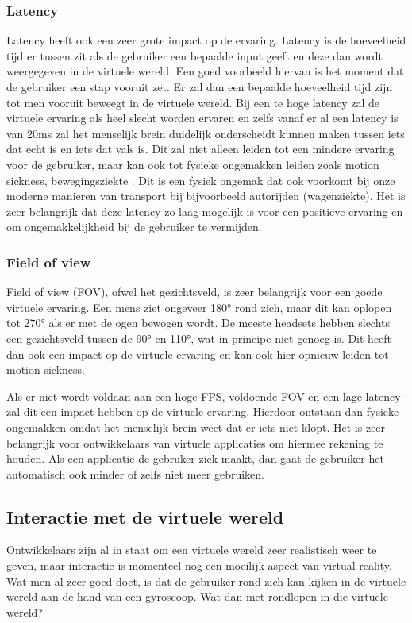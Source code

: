 \subsubsection{Latency}
\label{ssubsec:latency}
Latency heeft ook een zeer grote impact op de ervaring. Latency is de hoeveelheid tijd er tussen zit als de gebruiker een bepaalde input geeft en deze dan wordt weergegeven in de virtuele wereld. Een goed voorbeeld hiervan is het moment dat de gebruiker een stap vooruit zet. Er zal dan een bepaalde hoeveelheid tijd zijn tot men vooruit beweegt in de virtuele wereld. Bij een te hoge latency zal de virtuele ervaring als heel slecht worden ervaren en zelfs vanaf er al een latency is van 20ms zal het menselijk brein duidelijk onderscheidt kunnen maken tussen iets dat echt is en iets dat vals is. Dit zal niet alleen leiden tot een mindere ervaring voor de gebruiker, maar kan ook tot fysieke ongemakken leiden zoals motion sickness, bewegingsziekte \autocite{Pappas2016}. Dit is een fysiek ongemak dat ook voorkomt bij onze moderne manieren van transport bij bijvoorbeeld autorijden (wagenziekte). Het is zeer belangrijk dat deze latency zo laag mogelijk is voor een positieve ervaring en om ongemakkelijkheid bij de gebruiker te vermijden.

\subsubsection{Field of view}
\label{ssubsec:fov}
Field of view (FOV), ofwel het gezichtsveld, is zeer belangrijk voor een goede virtuele ervaring. Een mens ziet ongeveer 180° rond zich, maar dit kan oplopen tot 270° als er met de ogen bewogen wordt. De meeste headsets hebben slechts een gezichtsveld tussen de 90° en 110°, wat in principe niet genoeg is. Dit heeft dan ook een impact op de virtuele ervaring en kan ook hier opnieuw leiden tot motion sickness.

Als er niet wordt voldaan aan een hoge FPS, voldoende FOV en een lage latency zal dit een impact hebben op de virtuele ervaring. Hierdoor ontstaan dan fysieke ongemakken omdat het menselijk brein weet dat er iets niet klopt. Het is zeer belangrijk voor ontwikkelaars van virtuele applicaties om hiermee rekening te houden. Als een applicatie de gebruker ziek maakt, dan gaat de gebruiker het automatisch ook minder of zelfs niet meer gebruiken.

\subsection{Interactie met de virtuele wereld}
\label{subsec:interactie-vr}
Ontwikkelaars zijn al in staat om een virtuele wereld zeer realistisch weer te geven, maar interactie is momenteel nog een moeilijk aspect van virtual reality. Wat men al zeer goed doet, is dat de gebruiker rond zich kan kijken in de virtuele wereld aan de hand van een gyroscoop. Wat dan met rondlopen in die virtuele wereld?

